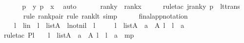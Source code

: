 \begin{isabellebody}
\ \ \isamarkupfalse%
\ \isamarkupfalse%
\ p\ \ {\isachardoublequoteopen}{\isacharless}{\kern0pt}y{\isacharcomma}{\kern0pt}\ p{\isachargreater}{\kern0pt}\ {\isasymin}\ x{\isachardoublequoteclose}\ \isamarkupfalse%
\ auto\ \isanewline
\ \ \isamarkupfalse%
\ \isamarkupfalse%
\ {\isachardoublequoteopen}rank{\isacharparenleft}{\kern0pt}y{\isacharparenright}{\kern0pt}\ {\isacharless}{\kern0pt}\ rank{\isacharparenleft}{\kern0pt}x{\isacharparenright}{\kern0pt}{\isachardoublequoteclose}\ \isanewline
\ \ \ \ \isamarkupfalse%
{\isacharparenleft}{\kern0pt}rule{\isacharunderscore}{\kern0pt}tac\ j{\isacharequal}{\kern0pt}{\isachardoublequoteopen}rank{\isacharparenleft}{\kern0pt}{\isacharless}{\kern0pt}y{\isacharcomma}{\kern0pt}\ p{\isachargreater}{\kern0pt}{\isacharparenright}{\kern0pt}{\isachardoublequoteclose}\ \ lt{\isacharunderscore}{\kern0pt}trans{\isacharparenright}{\kern0pt}\isanewline
\ \ \ \ \ \isamarkupfalse%
{\isacharparenleft}{\kern0pt}rule\ rank{\isacharunderscore}{\kern0pt}pair{}{\isacharcomma}{\kern0pt}\ rule\ rank{\isacharunderscore}{\kern0pt}lt{\isacharcomma}{\kern0pt}\ simp{\isacharparenright}{\kern0pt}\isanewline
\ \ \ \ \isamarkupfalse%
\isanewline
{}\isamarkupfalse%
%
\endisatagproof
{\isafoldproof}%
%
\isadelimproof
\isanewline
%
\endisadelimproof
\isanewline
{}\isamarkupfalse%
\ final{\isacharunderscore}{\kern0pt}app{\isacharunderscore}{\kern0pt}notation\ {\isacharcolon}{\kern0pt}\ \isanewline
\ \ \ l\ \ lin\ {\isacharcolon}{\kern0pt}\ {\isachardoublequoteopen}l\ {\isasymin}\ list{\isacharparenleft}{\kern0pt}A{\isacharparenright}{\kern0pt}{\isachardoublequoteclose}\ \ lnotnil\ {\isacharcolon}{\kern0pt}\ {\isachardoublequoteopen}l\ {\isasymnoteq}\ {\isacharbrackleft}{\kern0pt}{\isacharbrackright}{\kern0pt}{\isachardoublequoteclose}\isanewline
\ \ \ {\isachardoublequoteopen}{\isasymexists}l{\isacharprime}{\kern0pt}\ {\isasymin}\ list{\isacharparenleft}{\kern0pt}A{\isacharparenright}{\kern0pt}{\isachardot}{\kern0pt}\ {\isasymexists}\ a\ {\isasymin}\ A{\isachardot}{\kern0pt}\ l\ {\isacharequal}{\kern0pt}\ l{\isacharprime}{\kern0pt}\ {\isacharat}{\kern0pt}\ {\isacharbrackleft}{\kern0pt}a{\isacharbrackright}{\kern0pt}{\isachardoublequoteclose}\ \isanewline
%
\isadelimproof
\isanewline
\ \ %
\endisadelimproof
%
\isatagproof
{}\isamarkupfalse%
{\isacharparenleft}{\kern0pt}rule{\isacharunderscore}{\kern0pt}tac\ P{\isacharequal}{\kern0pt}{\isachardoublequoteopen}l\ {\isasymnoteq}\ {\isacharbrackleft}{\kern0pt}{\isacharbrackright}{\kern0pt}\ {\isasymlongrightarrow}\ {\isacharparenleft}{\kern0pt}{\isasymexists}l{\isacharprime}{\kern0pt}\ {\isasymin}\ list{\isacharparenleft}{\kern0pt}A{\isacharparenright}{\kern0pt}{\isachardot}{\kern0pt}\ {\isasymexists}\ a\ {\isasymin}\ A{\isachardot}{\kern0pt}\ l\ {\isacharequal}{\kern0pt}\ l{\isacharprime}{\kern0pt}\ {\isacharat}{\kern0pt}\ {\isacharbrackleft}{\kern0pt}a{\isacharbrackright}{\kern0pt}{\isacharparenright}{\kern0pt}{\isachardoublequoteclose}\ \ mp{\isacharparenright}{\kern0pt}\ \ \isanewline

\end{isabellebody}
